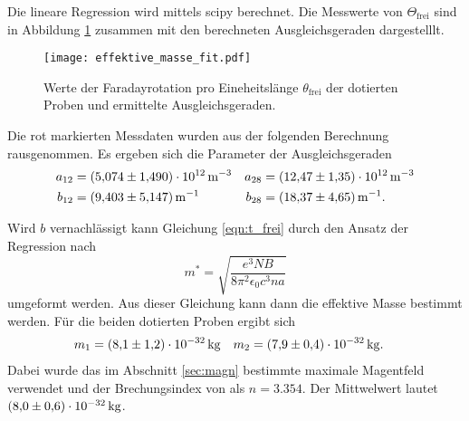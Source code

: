 Die lineare Regression wird mittels scipy \cite{scipy} berechnet. Die Messwerte von $\Theta_\mathrm{frei}$ sind in Abbildung \ref{fig:fit} zusammen mit den berechneten 
Ausgleichsgeraden dargestelllt. 

\begin{figure}
              \centering
              \texttt{[image: effektive\_masse\_fit.pdf]}
              \caption{Werte der Faradayrotation pro Eineheitslänge $\theta_\text{frei}$ der dotierten Proben und ermittelte Ausgleichsgeraden.}
              \label{fig:fit}
\end{figure}

Die rot markierten Messdaten wurden aus der folgenden Berechnung rausgenommen. Es ergeben sich die Parameter der Ausgleichsgeraden 
\begin{align*}
              a_{12} &= \qty{5.074+-1.490e12}{\metre^{-3}} &  a_{28} &= \qty{12.47+-1.35e12}{\metre^{-3}} \\
              b_{12} &= \qty{9.403+-5.147}{\metre^{-1}} & b_{28} &= \qty{18.37+-4.65}{\metre^{-1}}.
\end{align*}

Wird $b$ vernachlässigt kann Gleichung \eqref{eqn:t_frei} durch den Ansatz der Regression nach 
\begin{equation}
              \label{eqn:t_final}
              m^* = \sqrt{\frac{e^3NB}{8\pi^2\epsilon_0c^3na}}
\end{equation}
umgeformt werden. Aus dieser Gleichung kann dann die effektive Masse bestimmt werden. Für die beiden dotierten Proben ergibt sich 
\begin{align*}
              m_1 &= \qty{8.1+-1.2e-32}{\kilo\gram} & m_2 &=  \qty{7.9+-0.4e-32}{\kilo\gram}.
\end{align*}
Dabei wurde das im Abschnitt \ref{sec:magn} bestimmte maximale Magentfeld verwendet und der Brechungsindex von  als $n = \num{3.354}$.
Der Mittwelwert lautet $\qty{8+-0.6e-32}{\kilo\gram}$.